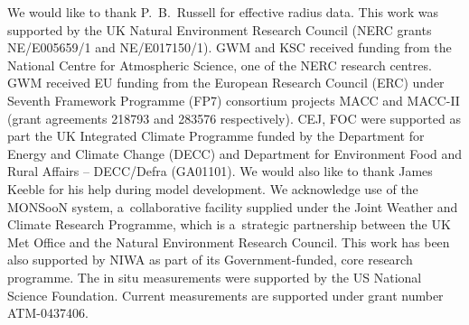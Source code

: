 \documentclass[acpd, hvmath, online]{copernicus_discussions}
\begin{document}
\begin{acknowledgements}
  We would  like to  thank P.~B.~Russell for effective  radius data.
  This  work was  supported  by the  UK  Natural Environment  Research
  Council  (NERC grants  NE/E005659/1 and  NE/E017150/1). GWM  and KSC
  received funding  from the National Centre  for Atmospheric Science,
  one of the  NERC research centres. GWM received  EU funding from the
  European  Research Council (ERC)  under Seventh  Framework Programme
  (FP7) consortium projects MACC  and MACC-II (grant agreements 218793
  and 283576  respectively).  CEJ, FOC were supported  as part
  the  UK Integrated Climate  Programme funded  by the  Department for
  Energy and Climate Change (DECC) and Department for Environment Food
  and Rural  Affairs --  DECC/Defra (GA01101). 
  We  would also  like to
  thank  James  Keeble for  his  help  during  model development.   We
  acknowledge  use  of the  MONSooN  system, a~collaborative  facility
  supplied  under the  Joint Weather  and Climate  Research Programme,
  which is a~strategic  partnership between the UK Met  Office and the
  Natural  Environment  Research Council.   This  work  has been  also
  supported by  NIWA as part  of its Government-funded,  core research
  programme.   The  in situ  measurements  were  supported  by the  US
  National  Science Foundation.   Current  measurements are  supported
  under grant number ATM-0437406.\hack{\\}
\hack{\\}
\end{acknowledgements}



\end{document}
